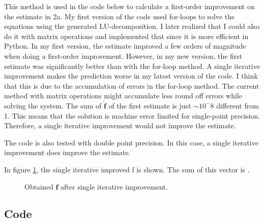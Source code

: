 This method is used in the code below to calculate a first-order improvement on the estimate in 2a. My first version of the code used for-loops to solve the equations using the generated LU-decomposition. I later realized that I could also do it with matrix operations and implemented that since it is more efficient in Python. In my first version, the estimate improved a few orders of magnitude when doing a first-order improvement. However, in my new version, the first estimate was significantly better than with the for-loop method. A single iterative improvement makes the prediction worse in my latest version of the code. I think that this is due to the accumulation of errors in the for-loop method. The current method with matrix operations might accumulate less round off errors while solving the system. The sum of $\hat{\mathbf{f}}$ of the first estimate is just $\sim 10^-8$ different from 1. This means that the solution is machine error limited for single-point precision. Therefore, a single iterative improvement would not improve the estimate.

The code is also tested with double point precision. In this case, a single iterative improvement does improve the estimate.

In figure \ref{fig:2b_f}, the single iterative improved f is shown. The sum of this vector is .

\begin{figure}[!ht]
    \centering
    
    \caption{Obtained $\mathbf{f}$ after single iterative improvement.}
    \label{fig:2b_f}
\end{figure}

\subsection*{Code}




\newpage
